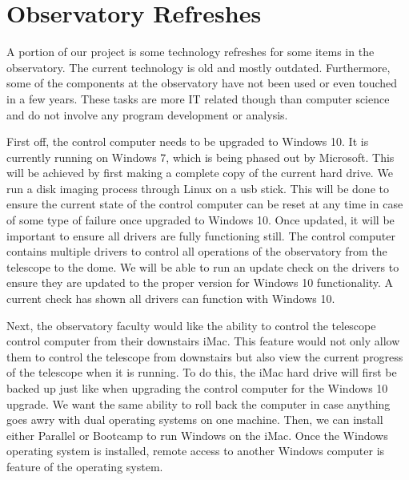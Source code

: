 \documentclass[12pt]{article}
\begin{document}
\section{Observatory Refreshes}

A portion of our project is some technology refreshes for some items in the observatory. The current technology is old and mostly outdated. Furthermore, some of the components at the observatory have not been used or even touched in a few years. These tasks are more IT related though than computer science and do not involve any program development or analysis.

First off, the control computer needs to be upgraded to Windows 10. It is currently running on Windows 7, which is being phased out by Microsoft. This will be achieved by first making a complete copy of the current hard drive. We run a disk imaging process through Linux on a usb stick. This will be done to ensure the current state of the control computer can be reset at any time in case of some type of failure once upgraded to Windows 10. Once updated, it will be important to ensure all drivers are fully functioning still. The control computer contains multiple drivers to control all operations of the observatory from the telescope to the dome. We will be able to run an update check on the drivers to ensure they are updated to the proper version for Windows 10 functionality. A current check has shown all drivers can function with Windows 10.

Next, the observatory faculty would like the ability to control the telescope control computer from their downstairs iMac. This feature would not only allow them to control the telescope from downstairs but also view the current progress of the telescope when it is running. To do this, the iMac hard drive will first be backed up just like when upgrading the control computer for the Windows 10 upgrade. We want the same ability to roll back the computer in case anything goes awry with dual operating systems on one machine. Then, we can install either Parallel or Bootcamp to run Windows on the iMac. Once the Windows operating system is installed, remote access to another Windows computer is feature of the operating system.
\end{document}
